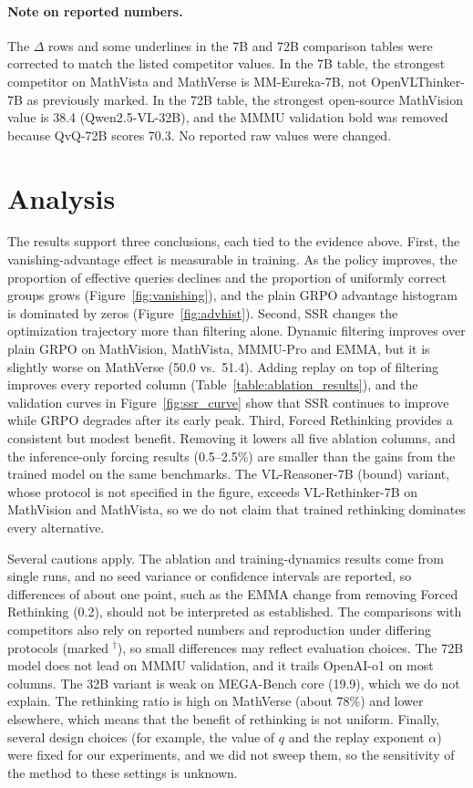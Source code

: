 \documentclass{article}
\begin{document}
\paragraph{Note on reported numbers.} The $\Delta$ rows and some underlines in the 7B and 72B comparison tables were corrected to match the listed competitor values. In the 7B table, the strongest competitor on MathVista and MathVerse is MM-Eureka-7B, not OpenVLThinker-7B as previously marked. In the 72B table, the strongest open-source MathVision value is 38.4 (Qwen2.5-VL-32B), and the MMMU validation bold was removed because QvQ-72B scores 70.3. No reported raw values were changed.

\section{Analysis}

The results support three conclusions, each tied to the evidence above. First, the vanishing-advantage effect is measurable in training. As the policy improves, the proportion of effective queries declines and the proportion of uniformly correct groups grows (Figure~\ref{fig:vanishing}), and the plain GRPO advantage histogram is dominated by zeros (Figure~\ref{fig:advhist}). Second, SSR changes the optimization trajectory more than filtering alone. Dynamic filtering improves over plain GRPO on MathVision, MathVista, MMMU-Pro and EMMA, but it is slightly worse on MathVerse (50.0 vs.\ 51.4). Adding replay on top of filtering improves every reported column (Table~\ref{table:ablation_results}), and the validation curves in Figure~\ref{fig:ssr_curve} show that SSR continues to improve while GRPO degrades after its early peak. Third, Forced Rethinking provides a consistent but modest benefit. Removing it lowers all five ablation columns, and the inference-only forcing results (0.5--2.5\%) are smaller than the gains from the trained model on the same benchmarks. The VL-Reasoner-7B (bound) variant, whose protocol is not specified in the figure, exceeds VL-Rethinker-7B on MathVision and MathVista, so we do not claim that trained rethinking dominates every alternative.

Several cautions apply. The ablation and training-dynamics results come from single runs, and no seed variance or confidence intervals are reported, so differences of about one point, such as the EMMA change from removing Forced Rethinking (0.2), should not be interpreted as established. The comparisons with competitors also rely on reported numbers and reproduction under differing protocols (marked $^\dagger$), so small differences may reflect evaluation choices. The 72B model does not lead on MMMU validation, and it trails OpenAI-o1 on most columns. The 32B variant is weak on MEGA-Bench core (19.9), which we do not explain. The rethinking ratio is high on MathVerse (about 78\%) and lower elsewhere, which means that the benefit of rethinking is not uniform. Finally, several design choices (for example, the value of $q$ and the replay exponent $\alpha$) were fixed for our experiments, and we did not sweep them, so the sensitivity of the method to these settings is unknown.
\end{document}

